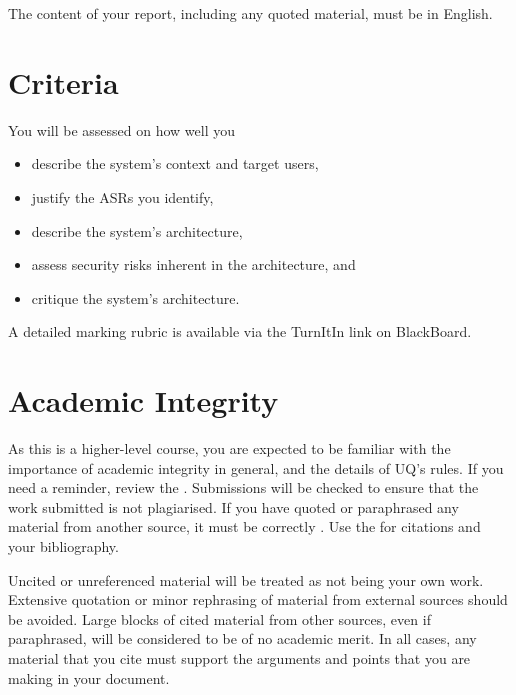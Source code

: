 \documentclass{csse4400}
\begin{document}
The content of your report, including any quoted material, must be in English.


\section{Criteria}
You will be assessed on how well you
\begin{itemize}%
    \item describe the system's context and target users,
    \item justify the ASRs you identify,
    \item describe the system's architecture,
    \item assess security risks inherent in the architecture, and
    \item critique the system's architecture.
\end{itemize}

\noindent
A detailed marking rubric is available via the TurnItIn link on BlackBoard.


\section{Academic Integrity}
As this is a higher-level course, you are expected to be familiar with the importance of academic integrity in general, and the details of UQ's rules.
If you need a reminder, review the .
Submissions will be checked to ensure that the work submitted is not plagiarised.
If you have quoted or paraphrased any material from another source, it must be correctly .
Use the  for citations and your bibliography.

Uncited or unreferenced material will be treated as not being your own work.
Extensive quotation or minor rephrasing of material from external sources should be avoided.
Large blocks of cited material from other sources, even if paraphrased, will be considered to be of no academic merit.
In all cases, any material that you cite must support the arguments and points that you are making in your document.

%
%
\end{document}
